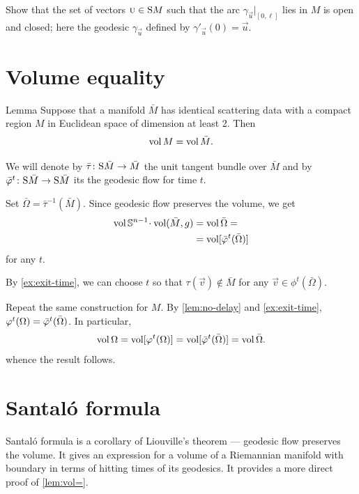  Show that the set of vectors $\vec u\in\S M$ such that the arc $\gamma_{\vec u}|_{[0, \ell]}$ lies in $M$ is open and closed;
here the geodesic $\gamma_{\vec u}$ defined by $\gamma'_{\vec u}(0)=\vec u$.

\section{Volume equality}

\begin{thm}{Lemma}\label{lem:vol=}
Suppose that a manifold $\bar M$ has identical scattering data with a compact region $M$ in Euclidean space of dimension at least 2.
Then 
\[\vol M=\vol \bar M.\]

\end{thm}

We will denote by $\bar \tau\:\S \bar M\to \bar M$ the unit tangent bundle over $\bar M$
and by $\bar\phi^t\:\S \bar M\to \S \bar M$ its the geodesic flow for time $t$.

Set $\bar\Omega=\bar \tau^{-1}(\bar M)$.
Since geodesic flow preserves the volume, we get 
\begin{align*}
\vol\SSS^{n-1}\cdot\vol(\bar M,g)&=\vol\bar\Omega=
\\
&=\vol[\bar\phi^t(\bar\Omega)]
\end{align*}
for any $t$.

By \ref{ex:exit-time}, we can choose $t$ so that $\tau(\vec v)\notin \bar M$ for any $\vec v\in \phi^t(\bar\Omega)$.

Repeat the same construction for $M$. 
By \ref{lem:no-delay} and \ref{ex:exit-time}, $\phi^t(\Omega)\z=\bar\phi^t(\bar\Omega)$.
In particular, 
\[
\vol\Omega=
\vol[\phi^t(\Omega)]=
\vol[\bar\phi^t(\bar\Omega)]=
\vol\bar\Omega.
\]
whence the result follows.
\qeds

\section{Santal\'{o} formula}

Santal\'{o} formula is a corollary of Liouville's theorem --- geodesic flow preserves the volume.
It gives an expression for a volume of a Riemannian manifold with boundary in terms of hitting times of its geodesics.
It provides a more direct proof of \ref{lem:vol=}.

